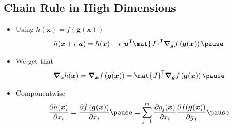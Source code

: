 \begin{slide}
\section[-1]{Chain Rule in High Dimensions}

\begin{PauseHighLight}
  \begin{itemize}
  \item Using $h(\bm{x}) = f(\bm{g}(\bm{x}))$
    \begin{align*}
      h(\bm{x}+\epsilon \, \bm{u}) = h(\bm{x}) + \epsilon\,  \, 
        \bm{u}^\tr \mat{J}^\tr \grad_{\bm{g}} f\bra{\bm{g}(\bm{x})} \pause
    \end{align*}
  \item We get that
    \begin{align*}
      \grad_{\bm{x}} h(\bm{x}) =  \grad_{\bm{x}} f\bra{\bm{g}(\bm{x})} =  \mat{J}^\tr \grad_{\bm{g}} f\bra{\bm{g}(\bm{x})} \pause
    \end{align*}
  \item Componentwise
    \begin{align*}
      \frac{\partial h(\bm{x})}{\partial x_i} =
      \frac{\partial f\bra{\bm{g}(\bm{x})}}{\partial x_i}\pause =
      \sum_{j=1}^m \frac{\partial g_j(\bm{x})}{\partial x_i}
      \frac{\partial f(\bm{g}(\bm{x}))}{\partial g_j} \pause
    \end{align*}
     
  \end{itemize}
\end{PauseHighLight}

\end{slide}

\Outline %

